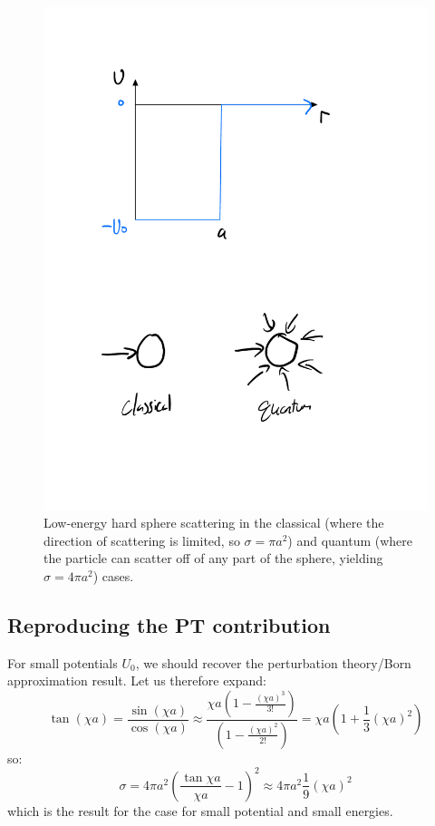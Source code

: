 \begin{figure}[htbp]
    \centering
    \includegraphics[scale=0.5]{Images/fig-quantumhardsphere.pdf}
    \caption{Low-energy hard sphere scattering in the classical (where the direction of scattering is limited, so $\sigma = \pi a^2$) and quantum (where the particle can scatter off of any part of the sphere, yielding $\sigma = 4\pi a^2$) cases.}
    \label{fig-quantumhardsphere}
\end{figure}

\subsection{Reproducing the PT contribution}
For small potentials $U_0$, we should recover the perturbation theory/Born approximation result. Let us therefore expand:
\begin{equation}
    \tan(\chi a) = \frac{\sin(\chi a)}{\cos(\chi a)} \approx \frac{\chi a (1 - \frac{(\chi a)^3}{3!})}{(1 - \frac{(\chi a)^2}{2!})} = \chi a \left(1 + \frac{1}{3}(\chi a)^2\right)
\end{equation}
so:
\begin{equation}
    \sigma = 4\pi a^2\left(\frac{\tan \chi a}{\chi a} - 1\right)^2 \approx 4\pi a^2 \frac{1}{9}(\chi a)^2
\end{equation}
which is the result for the case for small potential and small energies.

